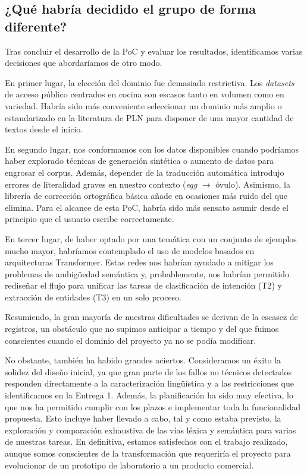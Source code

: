 \documentclass[11pt,a4paper,twoside]{article}
\theoremstyle{definition}
\numberwithin{equation}{section}
\begin{document}
\subsection{¿Qué habría decidido el grupo de forma diferente?}
Tras concluir el desarrollo de la PoC y evaluar los resultados, identificamos varias decisiones que abordaríamos de otro modo.

En primer lugar, la elección del dominio fue demasiado restrictiva. Los \textit{datasets} de acceso público centrados en cocina son escasos tanto en volumen como en variedad. Habría sido más conveniente seleccionar un dominio más amplio o estandarizado en la literatura de PLN para disponer de una mayor cantidad de textos desde el inicio. 

En segundo lugar, nos conformamos con los datos disponibles cuando podríamos haber explorado técnicas de generación sintética o aumento de datos para engrosar el corpus. Además, depender de la traducción automática introdujo errores de literalidad graves en nuestro contexto (\textit{egg} $\rightarrow$ óvulo). Asimismo, la librería de corrección ortográfica básica añade en ocasiones más ruido del que elimina. Para el alcance de esta PoC, habría sido más sensato asumir desde el principio que el usuario escribe correctamente.

En tercer lugar, de haber optado por una temática con un conjunto de ejemplos mucho mayor, habríamos contemplado el uso de modelos basados en arquitecturas Transformer. Estas redes nos habrían ayudado a mitigar los problemas de ambigüedad semántica y, probablemente, nos habrían permitido rediseñar el flujo para unificar las tareas de clasificación de intención (T2) y extracción de entidades (T3) en un solo proceso.

Resumiendo, la gran mayoría de nuestras dificultades se derivan de la escasez de registros, un obstáculo que no supimos anticipar a tiempo y del que fuimos conscientes cuando el dominio del proyecto ya no se podía modificar.

No obstante, también ha habido grandes aciertos. Consideramos un éxito la solidez del diseño inicial, ya que gran parte de los fallos no técnicos detectados responden directamente a la caracterización lingüística y a las restricciones que identificamos en la Entrega 1. Además, la planificación ha sido muy efectiva, lo que nos ha permitido cumplir con los plazos e implementar toda la funcionalidad propuesta. Esto incluye haber llevado a cabo, tal y como estaba previsto, la exploración y comparación exhaustiva de las vías léxica y semántica para varias de nuestras tareas. En definitiva, estamos satisfechos con el trabajo realizado, aunque somos conscientes de la transformación que requeriría el proyecto para evolucionar de un prototipo de laboratorio a un producto comercial.  
\end{document}
